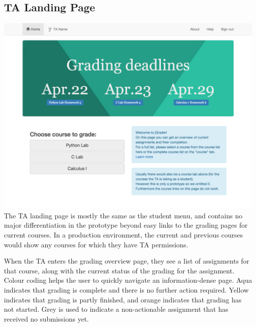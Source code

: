 \subsection{TA Landing Page}
\includegraphics[width=\textwidth]{screenshots/TALandingPage.png}
The TA landing page is mostly the same as the student menu, and contains no major differentiation in the prototype beyond easy links to the grading pages for current courses. In a production environment, the current and previous courses would show any courses for which they have TA permissions. 

When the TA enters the grading overview page, they see a list of assignments for that course, along with the current status of the grading for the assignment. Colour coding helps the user to quickly navigate an information-dense page. Aqua indicates that grading is complete and there is no further action required. Yellow indicates that grading is partly finished, and orange indicates that grading has not started. Grey is used to indicate a non-actionable assignment that has received no submissions yet.